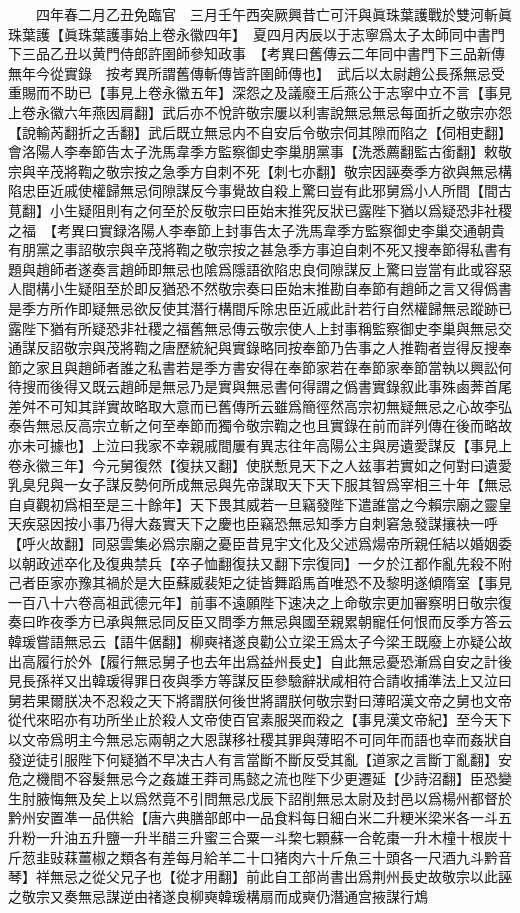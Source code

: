 　　四年春二月乙丑免臨官　三月壬午西突厥興昔亡可汗與眞珠葉護戰於雙河斬眞珠葉護【眞珠葉護事始上卷永徽四年】　夏四月丙辰以于志寧爲太子太師同中書門下三品乙丑以黄門侍郎許圉師參知政事　【考異曰舊傳云二年同中書門下三品新傳無年今從實錄　按考異所謂舊傳斬傳皆許圉師傳也】　武后以太尉趙公長孫無忌受重賜而不助已【事見上卷永徽五年】深怨之及議廢王后燕公于志寧中立不言【事見上卷永徽六年燕因肩翻】武后亦不悅許敬宗屢以利害說無忌無忌每面折之敬宗亦怨【說輸芮翻折之舌翻】武后既立無忌内不自安后令敬宗伺其隙而陷之【伺相吏翻】會洛陽人李奉節告太子洗馬韋季方監察御史李巢朋黨事【洗悉薦翻監古銜翻】敕敬宗與辛茂將鞫之敬宗按之急季方自刺不死【刺七亦翻】敬宗因誣奏季方欲與無忌構陷忠臣近戚使權歸無忌伺隙謀反今事覺故自殺上驚曰豈有此邪舅爲小人所間【間古莧翻】小生疑阻則有之何至於反敬宗曰臣始末推究反狀已露陛下猶以爲疑恐非社稷之福　【考異曰實録洛陽人李奉節上封事告太子洗馬韋季方監察御史李巢交通朝貴有朋黨之事詔敬宗與辛茂將鞫之敬宗按之甚急季方事迫自刺不死又搜奉節得私書有題與趙師者遂奏言趙師即無忌也隂爲隱語欲陷忠良伺隙謀反上驚曰豈當有此或容惡人間構小生疑阻至於即反猶恐不然敬宗奏曰臣始末推勘自奉節有趙師之言又得僞書是季方所作即疑無忌欲反使其潛行構間斥除忠臣近戚此計若行自然權歸無忌蹤跡已露陛下猶有所疑恐非社稷之福舊無忌傳云敬宗使人上封事稱監察御史李巢與無忌交通謀反詔敬宗與茂將鞫之唐歷統紀與實錄略同按奉節乃告事之人推鞫者豈得反搜奉節之家且與趙師者誰之私書若是季方書安得在奉節家若在奉節家奉節當執以興訟何待搜而後得又既云趙師是無忌乃是實與無忌書何得謂之僞書實錄叙此事殊鹵莾首尾差舛不可知其詳實故略取大意而已舊傳所云雖爲簡徑然高宗初無疑無忌之心故李弘泰告無忌反高宗立斬之何至奉節而獨令敬宗鞫之也且實錄在前而詳列傳在後而略故亦未可據也】上泣曰我家不幸親戚間屢有異志往年高陽公主與房遺愛謀反【事見上卷永徽三年】今元舅復然【復扶又翻】使朕慙見天下之人兹事若實如之何對曰遺愛乳臭兒與一女子謀反勢何所成無忌與先帝謀取天下天下服其智爲宰相三十年【無忌自貞觀初爲相至是三十餘年】天下畏其威若一旦竊發陛下遣誰當之今賴宗廟之靈皇天疾惡因按小事乃得大姦實天下之慶也臣竊恐無忌知季方自刺窘急發謀攘袂一呼【呼火故翻】同惡雲集必爲宗廟之憂臣昔見宇文化及父述爲煬帝所親任結以婚姻委以朝政述卒化及復典禁兵【卒子恤翻復扶又翻下宗復同】一夕於江都作亂先殺不附己者臣家亦豫其禍於是大臣蘇威裴矩之徒皆舞蹈馬首唯恐不及黎明遂傾隋室【事見一百八十六卷高祖武德元年】前事不遠願陛下速决之上命敬宗更加審察明日敬宗復奏曰昨夜季方已承與無忌同反臣又問季方無忌與國至親累朝寵任何恨而反季方答云韓瑗嘗語無忌云【語牛倨翻】柳奭禇遂良勸公立梁王爲太子今梁王既廢上亦疑公故出高履行於外【履行無忌舅子也去年出爲益州長史】自此無忌憂恐漸爲自安之計後見長孫祥又出韓瑗得罪日夜與季方等謀反臣參驗辭狀咸相符合請收捕準法上又泣曰舅若果爾朕决不忍殺之天下將謂朕何後世將謂朕何敬宗對曰薄昭漢文帝之舅也文帝從代來昭亦有功所坐止於殺人文帝使百官素服哭而殺之【事見漢文帝紀】至今天下以文帝爲明主今無忌忘兩朝之大恩謀移社稷其罪與薄昭不可同年而語也幸而姦狀自發逆徒引服陛下何疑猶不早决古人有言當斷不斷反受其亂【道家之言斷丁亂翻】安危之機間不容髮無忌今之姦雄王莽司馬懿之流也陛下少更遷延【少詩沼翻】臣恐變生肘腋悔無及矣上以爲然竟不引問無忌戊辰下詔削無忌太尉及封邑以爲楊州都督於黔州安置凖一品供給【唐六典膳部郎中一品食料每日細白米二升粳米梁米各一斗五升粉一升油五升鹽一升半醋三升蜜三合粟一斗棃七顆蘇一合乾棗一升木橦十根炭十斤䓤韭䜴䔉薑椒之類各有差每月給羊二十口猪肉六十斤魚三十頭各一尺酒九斗黔音琴】祥無忌之從父兄子也【從才用翻】前此自工部尚書出爲荆州長史故敬宗以此誣之敬宗又奏無忌謀逆由禇遂良柳奭韓瑗構扇而成奭仍潛通宫掖謀行鴆